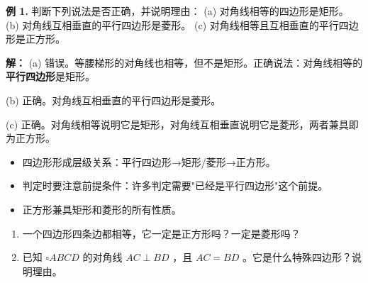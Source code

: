 \begin{workedexamples}


\textbf{例 1.} 判断下列说法是否正确，并说明理由：
(a) 对角线相等的四边形是矩形。
(b) 对角线互相垂直的平行四边形是菱形。
(c) 对角线相等且互相垂直的平行四边形是正方形。

\textbf{解：}
(a) 错误。等腰梯形的对角线也相等，但不是矩形。正确说法：对角线相等的\textbf{平行四边形}是矩形。

(b) 正确。对角线互相垂直的平行四边形是菱形。

(c) 正确。对角线相等说明它是矩形，对角线互相垂直说明它是菱形，两者兼具即为正方形。

\end{workedexamples}

\begin{keytakeaway}


\begin{itemize}
  \item 四边形形成层级关系：平行四边形→矩形/菱形→正方形。
  \item 判定时要注意前提条件：许多判定需要"已经是平行四边形"这个前提。
  \item 正方形兼具矩形和菱形的所有性质。
\end{itemize}


\end{keytakeaway}

\begin{practice}


\begin{enumerate}
  \item 一个四边形四条边都相等，它一定是正方形吗？一定是菱形吗？
  \item 已知 $\square ABCD$ 的对角线 $AC \perp BD$ ，且 $AC = BD$ 。它是什么特殊四边形？说明理由。
\end{enumerate}


\end{practice}



